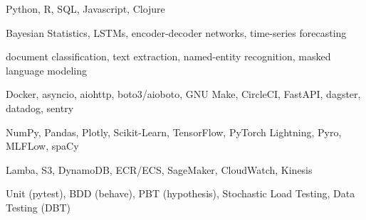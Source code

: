 \begin{cvskills}

	{Python, R, SQL, Javascript, Clojure}

	{Bayesian Statistics, LSTMs, encoder-decoder networks, time-series forecasting}

	{document classification, text extraction, named-entity recognition, masked language modeling}

	{Docker, asyncio, aiohttp, boto3/aioboto, GNU Make, CircleCI, FastAPI, dagster, datadog, sentry}

	{NumPy, Pandas, Plotly, Scikit-Learn, TensorFlow, PyTorch Lightning, Pyro, MLFLow, spaCy}

	{Lamba, S3, DynamoDB, ECR/ECS, SageMaker, CloudWatch, Kinesis}
        
        {Unit (pytest), BDD (behave), PBT (hypothesis), Stochastic Load Testing, Data Testing (DBT)}

\end{cvskills}
